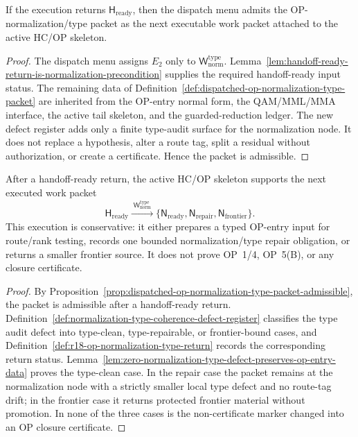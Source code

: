 \begin{proposition}
\label{prop:dispatched-op-normalization-type-packet-admissible}
If the execution returns \(\mathsf H_{\mathrm{ready}}\), then the dispatch menu admits the OP-normalization/type packet as the next executable work packet attached to the active HC/OP skeleton.
\end{proposition}

\begin{proof}
The dispatch menu assigns \(E_2\) only to \(\mathsf W_{\mathrm{norm}}^{\mathrm{type}}\). Lemma~\ref{lem:handoff-ready-return-is-normalization-precondition} supplies the required handoff-ready input status. The remaining data of Definition~\ref{def:dispatched-op-normalization-type-packet} are inherited from the OP-entry normal form, the QAM/MML/MMA interface, the active tail skeleton, and the guarded-reduction ledger. The new defect register adds only a finite type-audit surface for the normalization node. It does not replace a hypothesis, alter a route tag, split a residual without authorization, or create a certificate. Hence the packet is admissible.
\end{proof}

\begin{theorem}
\label{thm:first-dispatched-op-normalization-type-packet}
After a handoff-ready return, the active HC/OP skeleton supports the next executed work packet
\[
 \mathsf H_{\mathrm{ready}}
 \xrightarrow{\;\mathsf W_{\mathrm{norm}}^{\mathrm{type}}\;}
 \{\mathsf N_{\mathrm{ready}},\mathsf N_{\mathrm{repair}},\mathsf N_{\mathrm{frontier}}\}.
\]
This execution is conservative: it either prepares a typed OP-entry input for route/rank testing, records one bounded normalization/type repair obligation, or returns a smaller frontier source. It does not prove OP~1/4, OP~5(B), or any closure certificate.
\end{theorem}

\begin{proof}
By Proposition~\ref{prop:dispatched-op-normalization-type-packet-admissible}, the packet is admissible after a handoff-ready return. Definition~\ref{def:normalization-type-coherence-defect-register} classifies the type audit defect into type-clean, type-repairable, or frontier-bound cases, and Definition~\ref{def:r18-op-normalization-type-return} records the corresponding return status. Lemma~\ref{lem:zero-normalization-type-defect-preserves-op-entry-data} proves the type-clean case. In the repair case the packet remains at the normalization node with a strictly smaller local type defect and no route-tag drift; in the frontier case it returns protected frontier material without promotion. In none of the three cases is the non-certificate marker changed into an OP closure certificate.
\end{proof}

